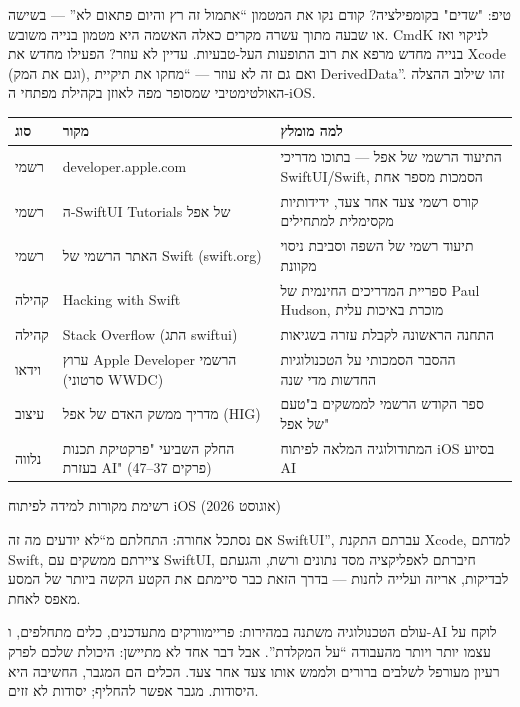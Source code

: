 \begin{tcbinfo}{טיפ: "שדים" בקומפילציה? קודם נקו את המטמון}
“אתמול זה רץ והיום פתאום לא” — בשישה או שבעה מתוך עשרה מקרים כאלה האשמה היא מטמון בנייה משובש. CmdK לניקוי ואז בנייה מחדש מרפא את רוב התופעות העל-טבעיות. עדיין לא עוזר? הפעילו מחדש את Xcode (וגם את המק), ואם גם זה לא עוזר — “מחקו את תיקיית DerivedData”. זהו שילוב ההצלה האולטימטיבי שמסופר מפה לאוזן בקהילת מפתחי ה-iOS.

\end{tcbinfo}



\begin{center}
\begin{tabularx}{\linewidth}{|X|X|X|}
\hline
\textbf{סוג} & \textbf{מקור} & \textbf{למה מומלץ} \tabularnewline
\hline
רשמי & developer.apple.com & התיעוד הרשמי של אפל — בתוכו מדריכי SwiftUI/Swift, הסמכות מספר אחת \tabularnewline
רשמי & ה-SwiftUI Tutorials של אפל & קורס רשמי צעד אחר צעד, ידידותיות מקסימלית למתחילים \tabularnewline
רשמי & האתר הרשמי של Swift (swift.org) & תיעוד רשמי של השפה וסביבת ניסוי מקוונת \tabularnewline
קהילה & Hacking with Swift & ספריית המדריכים החינמית של Paul Hudson, מוכרת באיכות עלית \tabularnewline
קהילה & Stack Overflow (התג swiftui) & התחנה הראשונה לקבלת עזרה בשגיאות \tabularnewline
וידאו & ערוץ Apple Developer הרשמי (סרטוני WWDC) & ההסבר הסמכותי על הטכנולוגיות החדשות מדי שנה \tabularnewline
עיצוב & מדריך ממשק האדם של אפל (HIG) & ספר הקודש הרשמי לממשקים ב"טעם של אפל" \tabularnewline
נלווה & החלק השביעי "פרקטיקת תכנות בעזרת AI" (פרקים 37–47) & המתודולוגיה המלאה לפיתוח iOS בסיוע AI \tabularnewline
\hline
\end{tabularx}
\end{center}

\begin{center}\small\color{gray}רשימת מקורות למידה לפיתוח iOS (אוגוסט 2026)\end{center}


אם נסתכל אחורה: התחלתם מ“לא יודעים מה זה SwiftUI”, עברתם התקנת Xcode, למדתם Swift, ציירתם ממשקים עם SwiftUI, חיברתם לאפליקציה מסד נתונים ורשת, והגעתם לבדיקות, אריזה ועלייה לחנות — בדרך הזאת כבר סיימתם את הקטע הקשה ביותר של המסע מאפס לאחת.

עולם הטכנולוגיה משתנה במהירות: פריימוורקים מתעדכנים, כלים מתחלפים, ו-AI לוקח על עצמו יותר ויותר מהעבודה “על המקלדת”. אבל דבר אחד לא מתיישן: היכולת שלכם לפרק רעיון מעורפל לשלבים ברורים ולממש אותו צעד אחר צעד. הכלים הם המגבר, החשיבה היא היסודות. מגבר אפשר להחליף; יסודות לא זזים.

